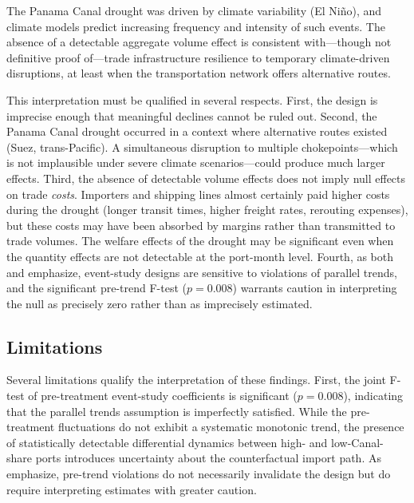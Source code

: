 \documentclass[12pt]{article}
\begin{document}
The Panama Canal drought was driven by climate variability (El Ni\~{n}o), and climate models predict increasing frequency and intensity of such events. The absence of a detectable aggregate volume effect is consistent with---though not definitive proof of---trade infrastructure resilience to temporary climate-driven disruptions, at least when the transportation network offers alternative routes.

This interpretation must be qualified in several respects. First, the design is imprecise enough that meaningful declines cannot be ruled out. Second, the Panama Canal drought occurred in a context where alternative routes existed (Suez, trans-Pacific). A simultaneous disruption to multiple chokepoints---which is not implausible under severe climate scenarios---could produce much larger effects. Third, the absence of detectable volume effects does not imply null effects on trade \textit{costs}. Importers and shipping lines almost certainly paid higher costs during the drought (longer transit times, higher freight rates, rerouting expenses), but these costs may have been absorbed by margins rather than transmitted to trade volumes. The welfare effects of the drought may be significant even when the quantity effects are not detectable at the port-month level. Fourth, as both \citet{roth2022pretest} and \citet{freyaldenhoven2019pre} emphasize, event-study designs are sensitive to violations of parallel trends, and the significant pre-trend F-test ($p = 0.008$) warrants caution in interpreting the null as precisely zero rather than as imprecisely estimated.

\subsection{Limitations}

Several limitations qualify the interpretation of these findings. First, the joint F-test of pre-treatment event-study coefficients is significant ($p = 0.008$), indicating that the parallel trends assumption is imperfectly satisfied. While the pre-treatment fluctuations do not exhibit a systematic monotonic trend, the presence of statistically detectable differential dynamics between high- and low-Canal-share ports introduces uncertainty about the counterfactual import path. As \citet{rambachan2023more} emphasize, pre-trend violations do not necessarily invalidate the design but do require interpreting estimates with greater caution.
\end{document}

